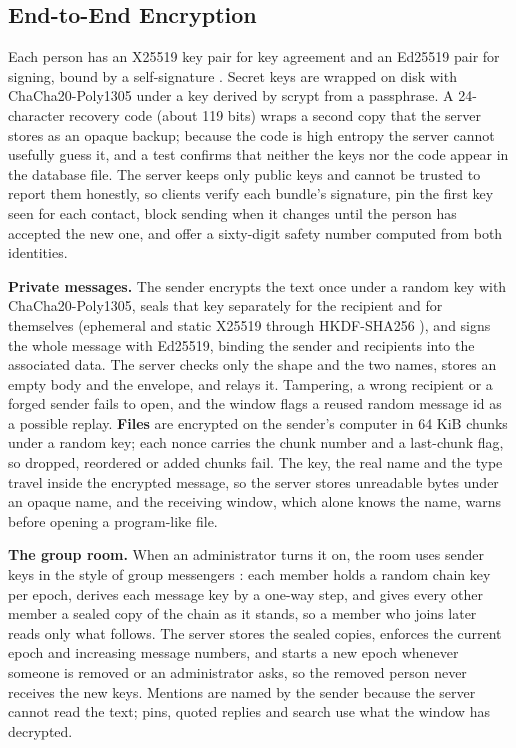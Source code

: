\documentclass[conference]{IEEEtran}
\begin{document}
\subsection{End-to-End Encryption}
Each person has an X25519 key pair for key agreement and an Ed25519 pair for signing, bound by a self-signature \cite{rfc7748,rfc8032}. Secret keys are wrapped on disk with ChaCha20-Poly1305 \cite{rfc8439} under a key derived by scrypt from a passphrase. A 24-character recovery code (about 119 bits) wraps a second copy that the server stores as an opaque backup; because the code is high entropy the server cannot usefully guess it, and a test confirms that neither the keys nor the code appear in the database file. The server keeps only public keys and cannot be trusted to report them honestly, so clients verify each bundle's signature, pin the first key seen for each contact, block sending when it changes until the person has accepted the new one, and offer a sixty-digit safety number computed from both identities.

\textbf{Private messages.} The sender encrypts the text once under a random key with ChaCha20-Poly1305, seals that key separately for the recipient and for themselves (ephemeral and static X25519 through HKDF-SHA256 \cite{rfc5869}), and signs the whole message with Ed25519, binding the sender and recipients into the associated data. The server checks only the shape and the two names, stores an empty body and the envelope, and relays it. Tampering, a wrong recipient or a forged sender fails to open, and the window flags a reused random message id as a possible replay. \textbf{Files} are encrypted on the sender's computer in 64 KiB chunks under a random key; each nonce carries the chunk number and a last-chunk flag, so dropped, reordered or added chunks fail. The key, the real name and the type travel inside the encrypted message, so the server stores unreadable bytes under an opaque name, and the receiving window, which alone knows the name, warns before opening a program-like file.

\textbf{The group room.} When an administrator turns it on, the room uses sender keys in the style of group messengers \cite{rfc9420}: each member holds a random chain key per epoch, derives each message key by a one-way step, and gives every other member a sealed copy of the chain as it stands, so a member who joins later reads only what follows. The server stores the sealed copies, enforces the current epoch and increasing message numbers, and starts a new epoch whenever someone is removed or an administrator asks, so the removed person never receives the new keys. Mentions are named by the sender because the server cannot read the text; pins, quoted replies and search use what the window has decrypted.
\end{document}
